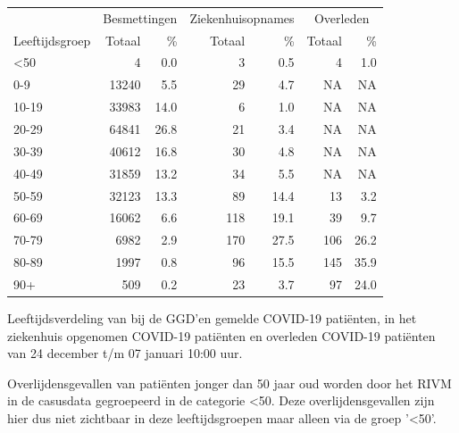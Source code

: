 \documentclass[
  english,
  man,floatsintext]{apa6}
\begin{document}
\begin{table}
\centering\begingroup\fontsize{11}{13}\selectfont

\begin{threeparttable}
\begin{tabular}{lrrrrrr}
\toprule
\multicolumn{1}{c}{ } & \multicolumn{2}{c}{Besmettingen} & \multicolumn{2}{c}{Ziekenhuisopnames} & \multicolumn{2}{c}{Overleden} \\
\cmidrule(l{3pt}r{3pt}){2-3} \cmidrule(l{3pt}r{3pt}){4-5} \cmidrule(l{3pt}r{3pt}){6-7}
Leeftijdsgroep & Totaal & \% & Totaal & \% & Totaal & \%\\
\midrule
<50 & 4 & 0.0 & 3 & 0.5 & 4 & 1.0\\
0-9 & 13240 & 5.5 & 29 & 4.7 & NA & NA\\
10-19 & 33983 & 14.0 & 6 & 1.0 & NA & NA\\
20-29 & 64841 & 26.8 & 21 & 3.4 & NA & NA\\
30-39 & 40612 & 16.8 & 30 & 4.8 & NA & NA\\
40-49 & 31859 & 13.2 & 34 & 5.5 & NA & NA\\
50-59 & 32123 & 13.3 & 89 & 14.4 & 13 & 3.2\\
60-69 & 16062 & 6.6 & 118 & 19.1 & 39 & 9.7\\
70-79 & 6982 & 2.9 & 170 & 27.5 & 106 & 26.2\\
80-89 & 1997 & 0.8 & 96 & 15.5 & 145 & 35.9\\
90+ & 509 & 0.2 & 23 & 3.7 & 97 & 24.0\\
\bottomrule
\end{tabular}
\begin{tablenotes}
\item[1] Leeftijdsverdeling van bij de GGD’en gemelde COVID-19 patiënten, in het ziekenhuis opgenomen COVID-19 patiënten en overleden COVID-19 patiënten van 24 december t/m 07 januari 10:00 uur.
\item[2] Overlijdensgevallen van patiënten jonger dan 50 jaar oud worden door het RIVM in de casusdata gegroepeerd in de categorie <50. Deze overlijdensgevallen zijn hier dus niet zichtbaar in deze leeftijdsgroepen maar alleen via de groep '<50'.
\end{tablenotes}
\end{threeparttable}
\endgroup{}
\end{table}

\newpage
\end{document}
